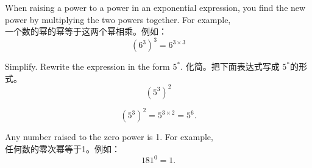 \begin{newprop}
When raising a power to a power in an exponential expression, you find the new power by multiplying the two powers together. For example, \\
一个数的幂的幂等于这两个幂相乘。例如：
$$
(6^3)^3 = 6^{3\times 3}
$$
\end{newprop}

\begin{example}
Simplify. Rewrite the expression in the form $5^{*}$. 化简。把下面表达式写成 $5^{*}$的形式。
$$
(5^3)^2
$$
\end{example}
\begin{solution}
$$
(5^3)^2 = 5^{3\times 2} = 5^6.
$$

\end{solution}\begin{newprop}
Any number raised to the zero power is 1. For example, \\
任何数的零次幂等于1。例如：
$$
181^0 = 1.
$$
\end{newprop}
\newpage
